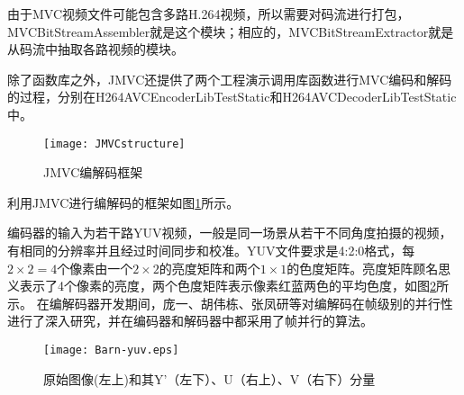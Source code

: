 由于MVC视频文件可能包含多路H.264视频，所以需要对码流进行打包，MVCBitStreamAssembler就是这个模块；相应的，MVCBitStreamExtractor就是从码流中抽取各路视频的模块。

除了函数库之外，JMVC还提供了两个工程演示调用库函数进行MVC编码和解码的过程，分别在H264AVCEncoderLibTestStatic和H264AVCDecoderLibTestStatic中。

\begin{figure}[htbp]
\begin{center}
\texttt{[image: JMVCstructure]}
\caption{JMVC编解码框架}
\label{fig:JMVCstructure}
\end{center}
\end{figure}

利用JMVC进行编解码的框架如图\ref{fig:JMVCstructure}所示。

编码器的输入为若干路YUV视频，一般是同一场景从若干不同角度拍摄的视频，有相同的分辨率并且经过时间同步和校准。YUV文件要求是4:2:0格式，每$2\times2=4$个像素由一个$2\times2$的亮度矩阵和两个$1\times1$的色度矩阵。亮度矩阵顾名思义表示了4个像素的亮度，两个色度矩阵表示像素红蓝两色的平均色度，如图\ref{fig:Barn-yuv}所示。
在编解码器开发期间，庞一、胡伟栋、张凤研等对编解码在帧级别的并行性进行了深入研究\cite{pang2009adaptive,yi2008parallelized}，并在编码器和解码器中都采用了帧并行的算法。

\begin{figure}[htbp]
\begin{center}
\texttt{[image: Barn-yuv.eps]}
\caption{原始图像(左上)和其Y'（左下）、U（右上）、V（右下）分量}
\label{fig:Barn-yuv}
\end{center}
\end{figure}
